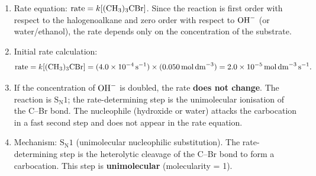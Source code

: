 \documentclass[11pt]{article}
\begin{document}
\begin{corrige}
\begin{enumerate}
\item Rate equation: \(\text{rate} = k[\ce{(CH3)3CBr}]\). Since the reaction is first order with respect to the halogenoalkane and zero order with respect to \(\ce{OH-}\) (or water/ethanol), the rate depends only on the concentration of the substrate.

\item Initial rate calculation:
\[
\text{rate} = k[\ce{(CH3)3CBr}] = (\SI{4.0e-4}{s^{-1}}) \times (\SI{0.050}{mol.dm^{-3}}) = \SI{2.0e-5}{mol.dm^{-3}.s^{-1}}.
\]

\item If the concentration of \(\ce{OH-}\) is doubled, the rate \textbf{does not change}. The reaction is \(\mathrm{S_N1}\); the rate-determining step is the unimolecular ionisation of the C–Br bond. The nucleophile (hydroxide or water) attacks the carbocation in a fast second step and does not appear in the rate equation.

\item Mechanism: \(\mathrm{S_N1}\) (unimolecular nucleophilic substitution). The rate-determining step is the heterolytic cleavage of the C–Br bond to form a carbocation. This step is \textbf{unimolecular} (molecularity = 1).
\end{enumerate}
\end{corrige}
\end{document}
